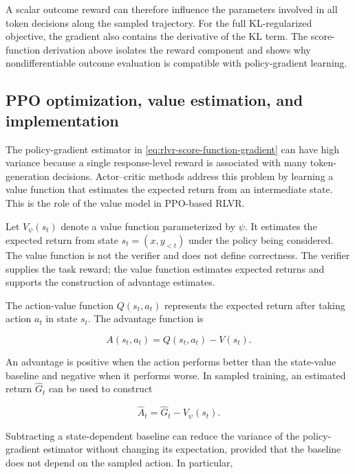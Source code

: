 A scalar outcome reward can therefore influence the parameters involved in
all token decisions along the sampled trajectory. For the full
KL-regularized objective, the gradient also contains the derivative of the
KL term. The score-function derivation above isolates the reward component
and shows why nondifferentiable outcome evaluation is compatible with
policy-gradient learning.

\subsection{PPO optimization, value estimation, and implementation}
\label{subsec:rlvr-ppo-implementation}

The policy-gradient estimator in \cref{eq:rlvr-score-function-gradient}
can have high variance because a single response-level reward is associated
with many token-generation decisions. Actor--critic methods address this
problem by learning a value function that estimates the expected return from
an intermediate state. This is the role of the value model in PPO-based
RLVR.

Let \(V_\psi(s_t)\) denote a value function parameterized by \(\psi\). It
estimates the expected return from state \(s_t=(x,y_{<t})\) under the policy
being considered. The value function is not the verifier and does not define
correctness. The verifier supplies the task reward; the value function
estimates expected returns and supports the construction of advantage
estimates.

The action-value function \(Q(s_t,a_t)\) represents the expected return
after taking action \(a_t\) in state \(s_t\). The advantage function is

\begin{equation}
    A(s_t,a_t)
    =
    Q(s_t,a_t)-V(s_t).
    \label{eq:rlvr-advantage-definition}
\end{equation}

An advantage is positive when the action performs better than the state-value
baseline and negative when it performs worse. In sampled training, an
estimated return \(\widehat{G}_t\) can be used to construct

\begin{equation}
    \widehat{A}_t
    =
    \widehat{G}_t-V_\psi(s_t).
    \label{eq:rlvr-advantage-estimate}
\end{equation}

Subtracting a state-dependent baseline can reduce the variance of the
policy-gradient estimator without changing its expectation, provided that
the baseline does not depend on the sampled action. In particular,

